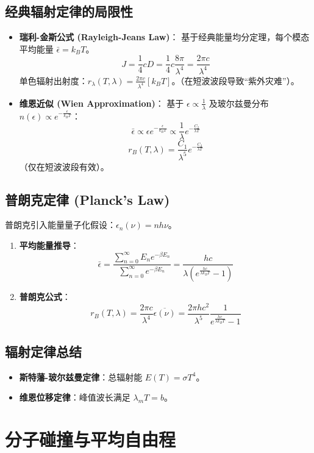 \documentclass{article}
\begin{document}
\subsection{经典辐射定律的局限性}
\begin{itemize}
    \item \textbf{瑞利-金斯公式 (Rayleigh-Jeans Law)}：
    基于经典能量均分定理，每个模态平均能量 $\bar{\epsilon} = k_B T$。
    \[ J = \frac{1}{4} c D = \frac{1}{4} c \frac{8\pi}{\lambda^4} = \frac{2\pi c}{\lambda^4} \]
    单色辐射出射度：$r_\lambda(T, \lambda) = \frac{2\pi c}{\lambda^4} [k_B T]$。（在短波波段导致“紫外灾难”）。
    \item \textbf{维恩近似 (Wien Approximation)}：
    基于 $\epsilon \propto \frac{1}{\lambda}$ 及玻尔兹曼分布 $n(\epsilon) \propto e^{-\frac{\epsilon}{k_B T}}$：
    \[ \bar{\epsilon} \propto \epsilon e^{-\frac{\epsilon}{k_B T}} \propto \frac{1}{\lambda} e^{-\frac{C_2}{\lambda T}} \]
    \[ r_B(T, \lambda) = \frac{C_1}{\lambda^5} e^{-\frac{C_2}{\lambda T}} \]
    （仅在短波波段有效）。
\end{itemize}

\subsection{普朗克定律 (Planck's Law)}
普朗克引入能量量子化假设：$\epsilon_n(\nu) = n h \nu$。
\begin{enumerate}
    \item \textbf{平均能量推导}：
    \[ \bar{\epsilon} = \frac{\sum_{n=0}^{\infty} E_n e^{-\beta E_n}}{\sum_{n=0}^{\infty} e^{-\beta E_n}} = \frac{hc}{\lambda \left( e^{\frac{hc}{\lambda k_B T}} - 1 \right)} \]
    \item \textbf{普朗克公式}：
    \[ r_B(T, \lambda) = \frac{2\pi c}{\lambda^4} \overline{\epsilon(\nu)} = \frac{2\pi h c^2}{\lambda^5} \frac{1}{e^{\frac{hc}{\lambda k_B T}} - 1} \]
\end{enumerate}

\subsection{辐射定律总结}
\begin{itemize}
    \item \textbf{斯特藩-玻尔兹曼定律}：总辐射能 $E(T) = \sigma T^4$。
    \item \textbf{维恩位移定律}：峰值波长满足 $\lambda_m T = b$。
\end{itemize}

\section{分子碰撞与平均自由程}
\end{document}
